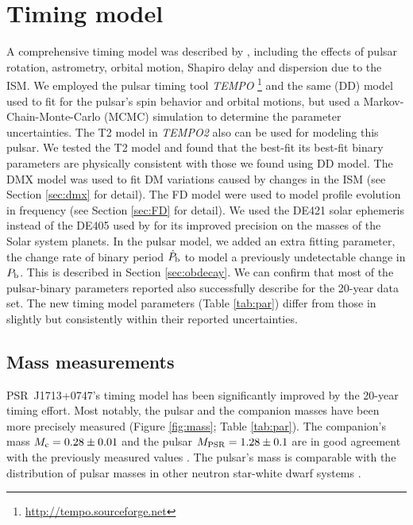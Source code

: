 \section{Timing model}
\label{sec:model}
A comprehensive timing model was described by \citet{sns+05},
including the effects of pulsar rotation, astrometry, orbital motion,
Shapiro delay and dispersion due to the ISM.
We employed the pulsar timing tool \textit{TEMPO}
\footnote{\url{http://tempo.sourceforge.net}} and the same
\citet{dd86} (DD) model \citet{sns+05} used to fit for the pulsar's
spin behavior and orbital motions, but used a Markov-Chain-Monte-Carlo
(MCMC) simulation to determine the parameter uncertainties.
The T2 model \citep{??} in \textit{TEMPO2} \citep{hem06} also can be used for modeling this pulsar. We tested the T2 model and found that the best-fit its best-fit binary parameters are physically consistent with those we found using DD model.
The DMX model was used to fit DM variations caused by changes in the ISM (see Section \ref{sec:dmx} for detail). The FD model were used to model profile
evolution in frequency (see Section \ref{sec:FD} for detail). 
We used the DE421 solar ephemeris instead of the DE405 used by
\citet{sns+05} for its improved precision on the masses of the Solar system planets. 
In the pulsar model, we added an extra fitting parameter, the change rate of binary period $\dot{P}_{\rm b}$ to model a previously undetectable change in $P_{\rm b}$. This is described in Section \ref{sec:obdecay}.    
We can confirm that most of the pulsar-binary parameters reported
\citet{sns+05} also successfully describe for the 20-year data
set. The new timing model parameters (Table \ref{tab:par}) differ from
those in \citet{sns+05} slightly but consistently within their reported uncertainties.



\subsection{Mass measurements}
\label{sec:mass}
PSR~J1713+0747's timing model has been significantly improved by the 20-year timing effort.
Most
notably, the pulsar and the companion masses have been more precisely measured
(Figure \ref{fig:mass}; Table \ref{tab:par}). The
companion's mass $M_{\rm c} = 0.28\pm0.01$ and the pulsar $M_{\rm PSR}=1.28\pm0.1$ are in good agreement with the previously measured values \cite{sns+05}.
The pulsar's mass is comparable with the distribution of pulsar masses
in other neutron star-white dwarf systems \citep{kkdt13}.

